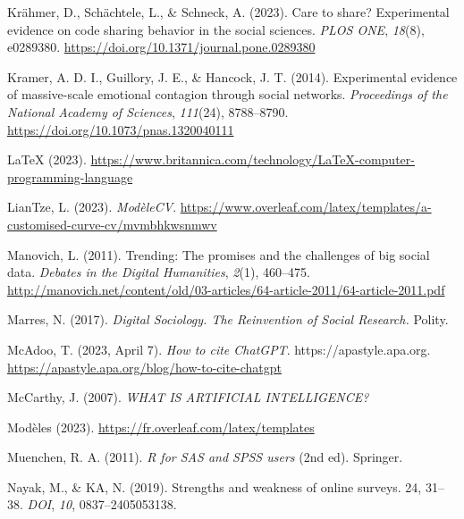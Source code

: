 \documentclass[
  letterpaper,
  DIV=11,
  numbers=noendperiod]{scrreprt}
\newlength{\cslhangindent}
\newlength{\cslentryspacingunit} %
\newenvironment{CSLReferences}[2] %
 {%
  \setlength{\parindent}{0pt}
  \ifodd #1
  \let\oldpar\par
  \def\par{\hangindent=\cslhangindent\oldpar}
  \fi
  \setlength{\parskip}{#2\cslentryspacingunit}
 }%
 {}
\begin{document}
\begin{CSLReferences}{1}{0}
\leavevmode{}%
Krähmer, D., Schächtele, L., \& Schneck, A. (2023). Care to share?
{Experimental} evidence on code sharing behavior in the social sciences.
\emph{PLOS ONE}, \emph{18}(8), e0289380.
\url{https://doi.org/10.1371/journal.pone.0289380}

\leavevmode{}%
Kramer, A. D. I., Guillory, J. E., \& Hancock, J. T. (2014).
Experimental evidence of massive-scale emotional contagion through
social networks. \emph{Proceedings of the National Academy of Sciences},
\emph{111}(24), 8788--8790.
\url{https://doi.org/10.1073/pnas.1320040111}

\leavevmode{}%
{LaTeX} (2023).
\url{https://www.britannica.com/technology/LaTeX-computer-programming-language}

\leavevmode{}%
LianTze, L. (2023). \emph{{ModèleCV}}.
\url{https://www.overleaf.com/latex/templates/a-customised-curve-cv/mvmbhkwsnmwv}

\leavevmode{}%
Manovich, L. (2011). Trending: {The} promises and the challenges of big
social data. \emph{Debates in the Digital Humanities}, \emph{2}(1),
460--475.
\url{http://manovich.net/content/old/03-articles/64-article-2011/64-article-2011.pdf}

\leavevmode{}%
Marres, N. (2017). \emph{Digital {Sociology}. {The Reinvention} of
{Social Research}.} Polity.

\leavevmode{}%
McAdoo, T. (2023, April 7). \emph{How to cite {ChatGPT}}.
https://apastyle.apa.org.
\url{https://apastyle.apa.org/blog/how-to-cite-chatgpt}

\leavevmode{}%
McCarthy, J. (2007). \emph{{WHAT IS ARTIFICIAL INTELLIGENCE}?}

\leavevmode{}%
Modèles (2023). \url{https://fr.overleaf.com/latex/templates}

\leavevmode{}%
Muenchen, R. A. (2011). \emph{R for {SAS} and {SPSS} users} (2nd ed).
Springer.

\leavevmode{}%
Nayak, M., \& KA, N. (2019). Strengths and weakness of online surveys.
24, 31--38. \emph{DOI}, \emph{10}, 0837--2405053138.


\end{CSLReferences}
\end{document}
